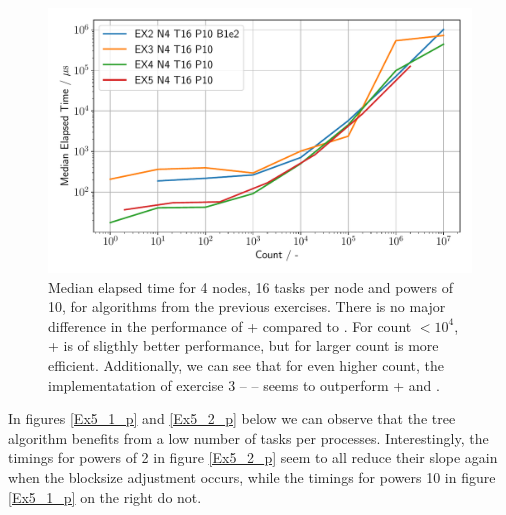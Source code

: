 

\begin{figure}[h]
    \begin{center}
        \includegraphics[width=0.9\linewidth]{figures/Ex5_3.pdf}
        \caption{Median elapsed time for 4 nodes, 16 tasks per node and powers of 10, for algorithms from the 
        previous exercises. There is no major difference in the performance of  +  
        compared to . For count $< 10^{4}$,  +  
        is of sligthly better performance, but for larger count  is more efficient. 
        Additionally, we can see that for even higher count, the implementatation of exercise 3 -- 
        -- seems to outperform  +  and .}
        \label{Ex5_3_p}
    \end{center}
\end{figure}

\pagebreak

In figures \ref{Ex5_1_p} and \ref{Ex5_2_p} below we can observe that the  tree algorithm 
benefits from a low number of tasks per processes. Interestingly, the timings for powers of 2 in figure \ref{Ex5_2_p}
seem to all reduce their slope again when the blocksize adjustment occurs, while the timings for powers 10 in figure
\ref{Ex5_1_p} on the right do not.

